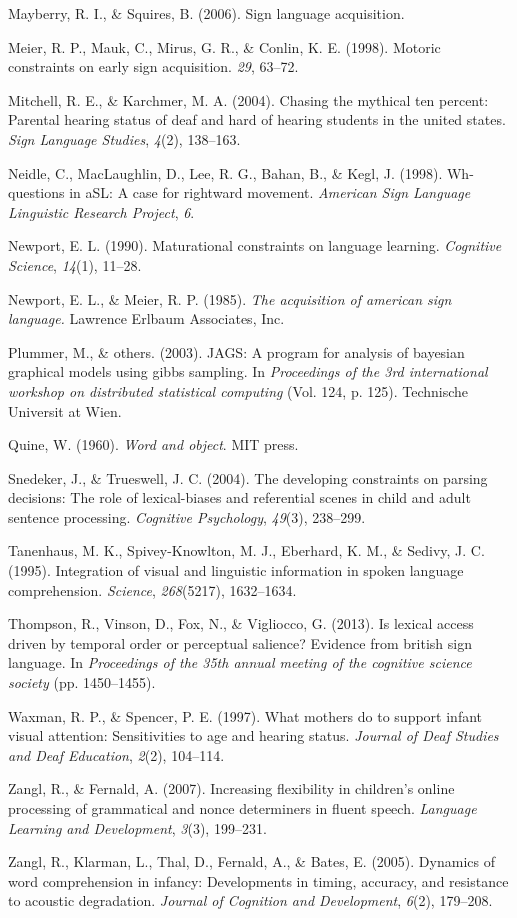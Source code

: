 \documentclass[12pt,]{article}
\begin{document}
Mayberry, R. I., \& Squires, B. (2006). Sign language acquisition.

Meier, R. P., Mauk, C., Mirus, G. R., \& Conlin, K. E. (1998). Motoric
constraints on early sign acquisition. \emph{29}, 63--72.

Mitchell, R. E., \& Karchmer, M. A. (2004). Chasing the mythical ten
percent: Parental hearing status of deaf and hard of hearing students in
the united states. \emph{Sign Language Studies}, \emph{4}(2), 138--163.

Neidle, C., MacLaughlin, D., Lee, R. G., Bahan, B., \& Kegl, J. (1998).
Wh-questions in aSL: A case for rightward movement. \emph{American Sign
Language Linguistic Research Project}, \emph{6}.

Newport, E. L. (1990). Maturational constraints on language learning.
\emph{Cognitive Science}, \emph{14}(1), 11--28.

Newport, E. L., \& Meier, R. P. (1985). \emph{The acquisition of
american sign language.} Lawrence Erlbaum Associates, Inc.

Plummer, M., \& others. (2003). JAGS: A program for analysis of bayesian
graphical models using gibbs sampling. In \emph{Proceedings of the 3rd
international workshop on distributed statistical computing} (Vol. 124,
p. 125). Technische Universit at Wien.

Quine, W. (1960). \emph{Word and object}. MIT press.

Snedeker, J., \& Trueswell, J. C. (2004). The developing constraints on
parsing decisions: The role of lexical-biases and referential scenes in
child and adult sentence processing. \emph{Cognitive Psychology},
\emph{49}(3), 238--299.

Tanenhaus, M. K., Spivey-Knowlton, M. J., Eberhard, K. M., \& Sedivy, J.
C. (1995). Integration of visual and linguistic information in spoken
language comprehension. \emph{Science}, \emph{268}(5217), 1632--1634.

Thompson, R., Vinson, D., Fox, N., \& Vigliocco, G. (2013). Is lexical
access driven by temporal order or perceptual salience? Evidence from
british sign language. In \emph{Proceedings of the 35th annual meeting
of the cognitive science society} (pp. 1450--1455).

Waxman, R. P., \& Spencer, P. E. (1997). What mothers do to support
infant visual attention: Sensitivities to age and hearing status.
\emph{Journal of Deaf Studies and Deaf Education}, \emph{2}(2),
104--114.

Zangl, R., \& Fernald, A. (2007). Increasing flexibility in children's
online processing of grammatical and nonce determiners in fluent speech.
\emph{Language Learning and Development}, \emph{3}(3), 199--231.

Zangl, R., Klarman, L., Thal, D., Fernald, A., \& Bates, E. (2005).
Dynamics of word comprehension in infancy: Developments in timing,
accuracy, and resistance to acoustic degradation. \emph{Journal of
Cognition and Development}, \emph{6}(2), 179--208.
\end{document}

